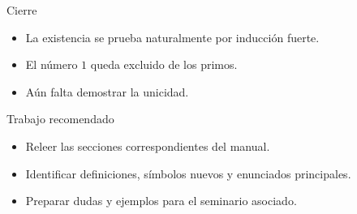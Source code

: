 \documentclass[aspectratio=169,11pt]{beamer}
\begin{document}
\begin{frame}{Cierre}
\begin{itemize}
  \item La existencia se prueba naturalmente por inducción fuerte.
  \item El número \(1\) queda excluido de los primos.
  \item Aún falta demostrar la unicidad.
\end{itemize}
\end{frame}

\begin{frame}{Trabajo recomendado}
\begin{itemize}
  \item Releer las secciones correspondientes del manual.
  \item Identificar definiciones, símbolos nuevos y enunciados principales.
  \item Preparar dudas y ejemplos para el seminario asociado.
\end{itemize}
\end{frame}
\end{document}
